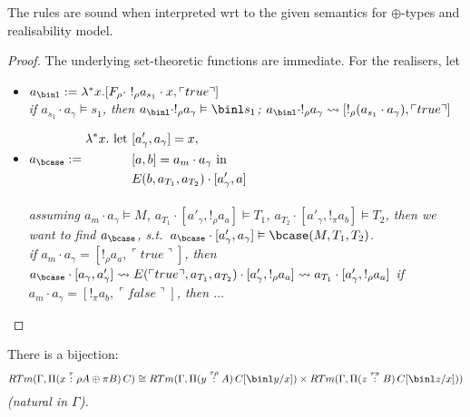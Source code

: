 \documentclass[12pt,a4paper]{article}
\begin{document}
\begin{claim}
  The rules are sound when interpreted wrt to the given semantics for $\oplus$-types and realisability model.
\end{claim}
\begin{proof}
  The underlying set-theoretic functions are immediate. For the realisers, let
  \begin{itemize}[noitemsep]
    \item $a_\binl \define \lambda^* x . [ F_\rho \cdot\ !_\rho a_{s_1}\cdot x , \ulcorner true \urcorner]$\\
    
    \emph{if $a_{s_1}\cdot {a_\gamma} \vDash  s_1$, then $a_\binl \cdot !_\rho a_\gamma \vDash \binl s_1$; $a_\binl \cdot !_\rho a_\gamma \leadsto [!_\rho (a_{s_1} \cdot a_\gamma) , \ulcorner true \urcorner]$}\\
    
    \item $a_\bcase \define 
    \begin{aligned}
      \lambda^* x .\text{ let } & [a'_\gamma, a_\gamma] = x, \\
      &[a , b] = a_m \cdot a_\gamma \text{ in }\\
      & E(b, a_{T_1}, a_{T_2}) \cdot [ a'_\gamma , a]      
    \end{aligned}$\\
    \\
    \emph{assuming $a_m \cdot a_\gamma \vDash M$,  $a_{T_1} \cdot [a'_\gamma, !_\rho a_a] \vDash T_1$, $a_{T_2} \cdot [a'_\gamma, !_\pi a_b] \vDash T_2$, then we want to find $a_\bcase$, s.t.\ $a_\bcase\cdot [a'_\gamma, a_\gamma] \vDash \bcase(M, T_1, T_2)$.\\ 
      \subitem if $a_m \cdot a_\gamma = [!_\rho a_a , \ulcorner true \urcorner]$, then $a_\bcase \cdot [a_\gamma , a'_\gamma] \leadsto E(\ulcorner true \urcorner, a_{T_1}, a_{T_2})\cdot [a'_
      \gamma, !_\rho a_a] \leadsto a_{T_1} \cdot [a'_\gamma, !_\rho a_a]$
      \subitem if $a_m \cdot a_\gamma = [!_\pi a_b, \ulcorner false \urcorner]$, then $\dots$} 
  \end{itemize}
\end{proof}

\begin{claim}
  There is a bijection:
  $$RTm(\Gamma, \Pi (x \of{\tau} \rho A \oplus \pi B)\, C) \cong RTm(\Gamma, \Pi (y \of{\tau\rho}A)\, C[\binl y /x]) \times RTm(\Gamma, \Pi(z \of{\tau\pi} B)\, C[\binl z /x]))$$
  \textit{(natural in $\Gamma$).}
\end{claim}
\end{document}
